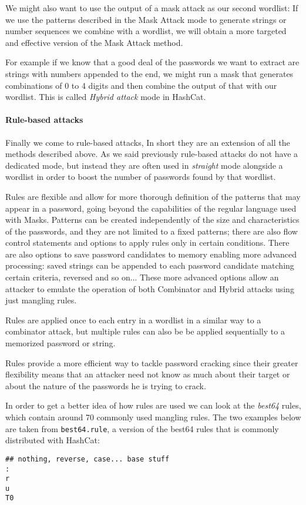 We might also want to use the output of a mask attack as our second wordlist: If we use the patterns described in the Mask Attack mode to generate strings or number sequences we combine with a wordlist, we will obtain a more targeted and effective version of the Mask Attack method. 

For example if we know that a good deal of the passwords we want to extract are strings with numbers appended to the end, we might run a mask that generates combinations of 0 to 4 digits and then combine the output of that with our wordlist. This is called \emph{Hybrid attack} mode in HashCat.

\paragraph{Rule-based attacks}\label{par:rule-based}
Finally we come to rule-based attacks, In short they are an extension of all the methods described above. 
As we said previously  rule-based attacks do not have a dedicated mode, but instead they are often used in \emph{straight} mode alongside a wordlist in order to boost the number of passwords found by that wordlist.

Rules are flexible and allow for more thorough definition of the patterns that may appear in a password, going beyond the capabilities of the regular language used with Masks.
Patterns can be created independently of the size and characteristics of the passwords, and they are not limited to a fixed patterns; there are also flow control statements and options to apply rules only in certain conditions.
There are also options to save password candidates to memory enabling more advanced processing: saved strings can be appended to each password candidate matching certain criteria, reversed and so on...
These more advanced options allow an attacker to emulate the operation of both Combinator and Hybrid attacks using just mangling rules. 

Rules are applied once to each entry in a wordlist in a similar way to a combinator attack, but multiple rules can also be be applied sequentially to a memorized password or string.

Rules provide a more efficient way to tackle password cracking since their greater flexibility means that an attacker need not know as much about their target or about the nature of the passwords he is trying to crack. 

In order to get a better idea of how rules are used we can look at the \emph{best64} rules, which contain around 70 commonly used mangling rules. The two examples below are taken from \texttt{best64.rule}, a version of the best64 rules that is commonly distributed with HashCat:
\begin{verbatim}
## nothing, reverse, case... base stuff
:
r
u
T0
\end{verbatim}

